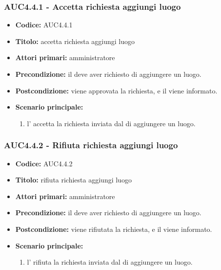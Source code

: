 \documentclass[casi-duso]{subfiles}
\begin{document}
\subsubsection{AUC4.4.1 - Accetta richiesta aggiungi luogo}
\label{subsub:AUC4.4.1}
\begin{itemize}
  \item \textbf{Codice:} AUC4.4.1
  \item \textbf{Titolo:} accetta richiesta aggiungi luogo
  \item \textbf{Attori primari:} amministratore
  \item \textbf{Precondizione:} il  deve aver richiesto di aggiungere un luogo.
  \item \textbf{Postcondizione:} viene approvata la richiesta, e il  viene informato.
  \item \textbf{Scenario principale:} 
  \begin{enumerate}
    \item  l' accetta la richiesta inviata dal  di aggiungere un luogo.
  \end{enumerate}
\end{itemize}

\subsubsection{AUC4.4.2 - Rifiuta richiesta aggiungi luogo}
\label{subsub:AUC4.4.2}
\begin{itemize}
  \item \textbf{Codice:} AUC4.4.2
  \item \textbf{Titolo:} rifiuta richiesta aggiungi luogo
  \item \textbf{Attori primari:} amministratore
  \item \textbf{Precondizione:} il  deve aver richiesto di aggiungere un luogo.
  \item \textbf{Postcondizione:} viene rifiutata la richiesta, e il  viene informato.
  \item \textbf{Scenario principale:} 
  \begin{enumerate}
    \item l' rifiuta la richiesta inviata dal  di aggiungere un luogo.
  \end{enumerate}
\end{itemize}
\end{document}
